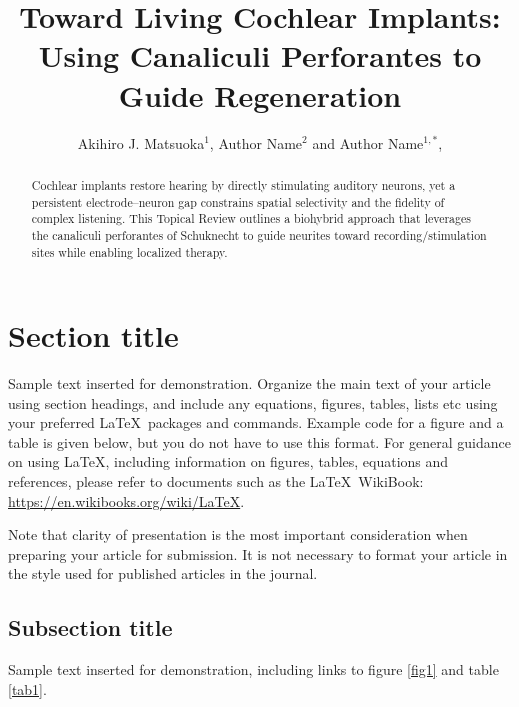 \documentclass{iopjournal}
\begin{document}

\title{Toward Living Cochlear Implants: Using Canaliculi Perforantes to
Guide Regeneration}

\author{Akihiro J. Matsuoka$^1$, Author Name$^2$ and Author Name$^{1,*}$, }






\begin{abstract}
Cochlear implants restore hearing by directly stimulating auditory neurons, yet a persistent electrode–neuron gap constrains spatial selectivity and the fidelity of complex listening. This Topical
Review outlines a biohybrid approach that leverages the canaliculi perforantes of Schuknecht to guide neurites toward recording/stimulation sites while enabling localized therapy.
\end{abstract}

\section{Section title}
Sample text inserted for demonstration. Organize the main text of your article using section headings, and include any equations, figures, tables, lists etc using your preferred \LaTeX\ packages and commands. Example code for a figure and a table is given below, but you do not have to use this format. For general guidance on using \LaTeX , including information on figures, tables, equations and references, please refer to documents such as the \LaTeX\ WikiBook: \href{https://en.wikibooks.org/wiki/LaTeX}{https://en.wikibooks.org/wiki/LaTeX}.

Note that clarity of presentation is the most important consideration when preparing your article for submission. It is not necessary to format your article in the style used for published articles in the journal.

\subsection{Subsection title}
Sample text inserted for demonstration, including links to figure \ref{fig1} and table \ref{tab1}.
\end{document}
